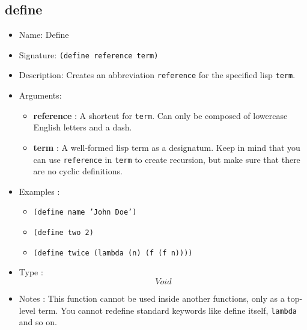 \subsection{define}
\begin{itemize}
    \item Name: Define
    \item Signature: \texttt{(define reference term)}
    \item Description: Creates an abbreviation \texttt{reference} for the specified lisp \texttt{term}.
    \item Arguments:
        \begin{itemize}
            \item \textbf{reference} : A shortcut for \texttt{term}. Can only be composed of lowercase English letters and a dash.
            \item \textbf{term} : A well-formed lisp term as a designatum. Keep in mind that you can use \texttt{reference} in \texttt{term} to create recursion, but make sure that there are no cyclic definitions.
        \end{itemize}
    \item Examples :
        \begin{itemize}
            \item \texttt{(define name 'John Doe')}
            \item \texttt{(define two 2)}
            \item \texttt{(define twice (lambda (n) (f (f n))))}
        \end{itemize}
    \item Type : \[Void\]
    \item Notes : This function cannot be used inside another functions, only as a top-level term. You cannot redefine standard keywords like define itself, \texttt{lambda} and so on.
\end{itemize}

